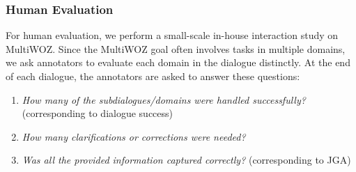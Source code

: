 \subsubsection*{Human Evaluation}
For human evaluation, we perform a small-scale in-house interaction study on MultiWOZ.
Since the MultiWOZ goal often involves tasks in multiple domains, we ask annotators to evaluate each domain in the dialogue distinctly.
At the end of each dialogue, the annotators are asked to answer these questions:
\begin{enumerate}
    \item \emph{How many of the subdialogues/domains were handled successfully?} (corresponding to dialogue success)
    \item \emph{How many clarifications or corrections were needed?}
    \item \emph{Was all the provided information captured correctly?} (corresponding to JGA)
\end{enumerate}


